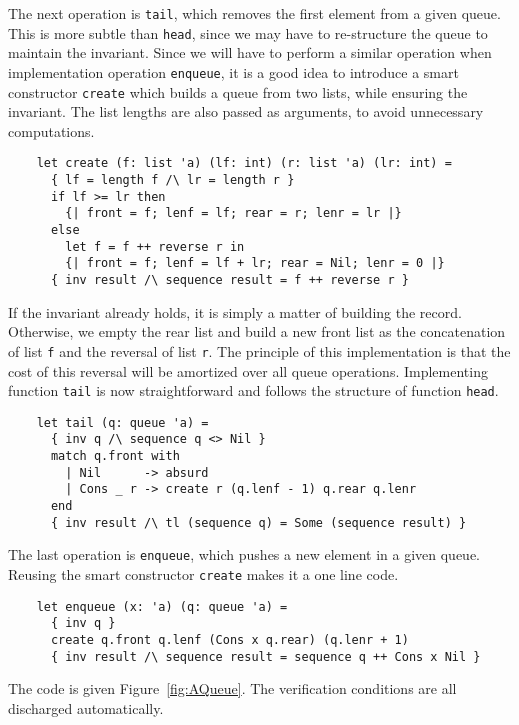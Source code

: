 The next operation is \texttt{tail}, which removes the first element
from a given queue. This is more subtle than \texttt{head}, since we
may have to re-structure the queue to maintain the invariant.
Since we will have to perform a similar operation when implementation
operation \texttt{enqueue}, it is a good idea to introduce a smart
constructor \texttt{create} which builds a queue from two lists, while
ensuring the invariant. The list lengths are also passed as arguments,
to avoid unnecessary computations.
\begin{verbatim}
    let create (f: list 'a) (lf: int) (r: list 'a) (lr: int) =
      { lf = length f /\ lr = length r }
      if lf >= lr then
        {| front = f; lenf = lf; rear = r; lenr = lr |}
      else
        let f = f ++ reverse r in
        {| front = f; lenf = lf + lr; rear = Nil; lenr = 0 |}
      { inv result /\ sequence result = f ++ reverse r }
\end{verbatim}
If the invariant already holds, it is simply a matter of building the
record. Otherwise, we empty the rear list and build a new front list
as the concatenation of list \texttt{f} and the reversal of list \texttt{r}.
The principle of this implementation is that the cost of this reversal
will be amortized over all queue operations. Implementing function
\texttt{tail} is now straightforward and follows the structure of
function \texttt{head}.
\begin{verbatim}
    let tail (q: queue 'a) =
      { inv q /\ sequence q <> Nil }
      match q.front with
        | Nil      -> absurd
        | Cons _ r -> create r (q.lenf - 1) q.rear q.lenr
      end
      { inv result /\ tl (sequence q) = Some (sequence result) }
\end{verbatim}
The last operation is \texttt{enqueue}, which pushes a new element in
a given queue. Reusing the smart constructor \texttt{create} makes it
a one line code.
\begin{verbatim}
    let enqueue (x: 'a) (q: queue 'a) =
      { inv q }
      create q.front q.lenf (Cons x q.rear) (q.lenr + 1)
      { inv result /\ sequence result = sequence q ++ Cons x Nil }
\end{verbatim}
The code is given Figure~\ref{fig:AQueue}. The verification conditions
are all discharged automatically.
